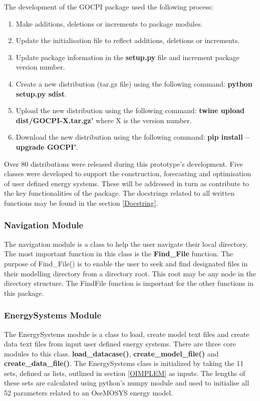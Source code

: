 \documentclass[12pt]{article}
\begin{document}
The development of the GOCPI package used the following process:
\begin{enumerate}
	\item Make additions, deletions or increments to package modules.
	\item Update the initialisation file to reflect additions, deletions or increments.
	\item Update package information in the \textbf{setup.py} file and increment package version number.
	\item Create a new distribution (tar.gz file) using the following command: \textbf{python setup.py sdist}.
	\item Upload the new distribution using the following command: \textbf{twine upload dist/GOCPI-X.tar.gz'} where X is the version number.
	\item Download the new distribution using the following command: \textbf{pip install --upgrade GOCPI'}.
\end{enumerate}

Over 80 distributions were released during this prototype's development. 
Five classes were developed to support the construction, forecasting and optimisation of user defined energy systems.
These will be addressed in turn as contribute to the key functionalities of the package.
The docstrings related to all written functions may be found in the section \ref{Docstring}.

\subsubsection{Navigation Module}
The navigation module is a class to help the user navigate their local directory. 
The most important function in this class is the \textbf{Find\_File} function.
The purpose of Find\_File() is to enable the user to seek and find designated files in their modelling directory from a directory root.
This root may be any node in the directory structure. 
The FindFile function is important for the other functions in this package.

\subsubsection{EnergySystems Module} \label{ESM}
The EnergySystems module is a class to load, create model text files and create data text files from input user defined energy systems. 
There are three core modules to this class. \textbf{load\_datacase()}, \textbf{create\_model\_file()} and \textbf{create\_data\_file()}.
The EnergySystems class is initialized by taking the 11 sets, defined as lists, outlined in section \ref{OIMPLEM} as inputs. 
The lengths of these sets are calculated using python's numpy module and used to initialise all 52 parameters related to an OseMOSYS energy model.
\end{document}
